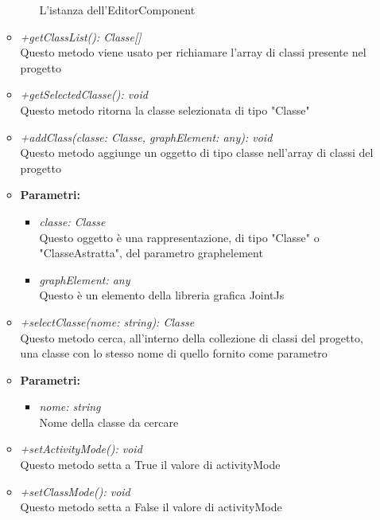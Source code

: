 \begin{itemize}
\begin{itemize}
\begin{itemize}
            					L'istanza dell'EditorComponent
            				\end{itemize}
          				\item \emph{+getClassList(): Classe[]}\\
          				Questo metodo viene usato per richiamare l'array di classi presente nel progetto
          				\item \emph{+getSelectedClasse(): void}\\
          				Questo metodo ritorna la classe selezionata di tipo "Classe"
          				\item \emph{+addClass(classe: Classe, graphElement: any): void}\\
          				Questo metodo aggiunge un oggetto di tipo classe nell'array di classi del progetto
          				\item \textbf{Parametri:}\\
            				\begin{itemize}
            					\item \emph{classe: Classe}\\
            					Questo oggetto è una rappresentazione, di tipo "Classe" o "ClasseAstratta", del parametro graphelement
            					\item \emph{graphElement: any}\\
            					Questo è un elemento della libreria grafica JointJs
            				\end{itemize}
          				\item \emph{+selectClasse(nome: string): Classe}\\
          				Questo metodo cerca, all'interno della collezione di classi del progetto, una classe con lo stesso nome di quello fornito come parametro
          				\item \textbf{Parametri:}\\
            				\begin{itemize}
            					\item \emph{nome: string}\\
            					Nome della classe da cercare
            				\end{itemize}
          				\item \emph{+setActivityMode(): void}\\
          				Questo metodo setta a True il valore di activityMode
          				\item \emph{+setClassMode(): void}\\
          				Questo metodo setta a False il valore di activityMode

\end{itemize}
\end{itemize}
